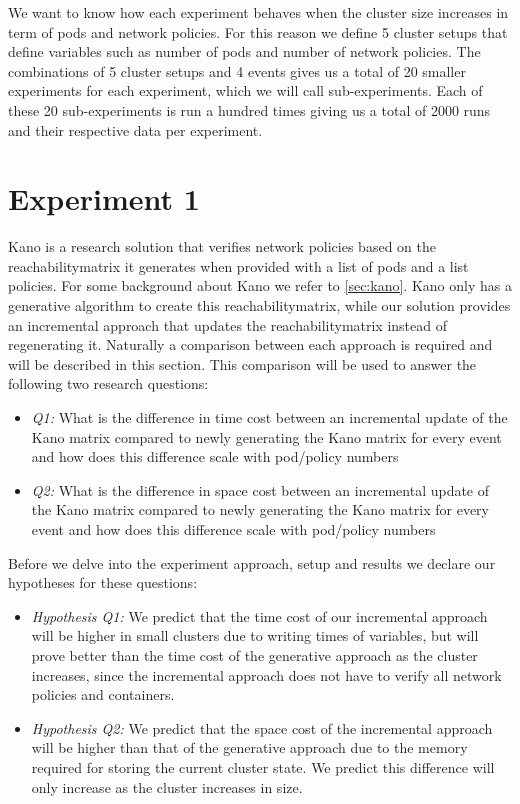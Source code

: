 We want to know how each experiment behaves when the cluster size increases in term of pods and network policies. For this reason we define 5 cluster setups that define variables such as number of pods and number of network policies. The combinations of 5 cluster setups and 4 events gives us a total of 20 smaller experiments for each experiment,  which we will call sub-experiments.  Each of these 20 sub-experiments is run a hundred times giving us a total of 2000 runs and their respective data per experiment.
\\[10pt]


\section{Experiment 1}\label{sec:experiment1}
Kano is a research solution that verifies network policies  based on the reachabilitymatrix it generates when provided with a list of pods and a list policies. For some background about Kano we refer to \autoref{sec:kano}. Kano only has a generative algorithm to create this reachabilitymatrix, while our solution provides an incremental approach that updates the reachabilitymatrix instead of regenerating it. Naturally a comparison between each approach is required and will be described in this section. This comparison will be used to answer the following two research questions:

\begin{itemize}
    \item \textit{Q1:} What is the difference in time cost between an incremental update of the Kano matrix compared to newly generating the Kano matrix for every event and how does this difference scale with pod/policy numbers
    \item \textit{Q2:} What is the difference in space cost between an incremental update of the Kano matrix compared to newly generating the Kano matrix for every event and how does this difference scale with pod/policy numbers
\end{itemize}

Before we delve into the experiment approach, setup and results we declare our hypotheses for these questions:

\begin{itemize}
    \item \textit{Hypothesis Q1:} We predict that the time cost of our incremental approach will be higher in small clusters due to writing times of variables, but will prove better than the time cost of the generative approach as the cluster increases, since the incremental approach does not have to verify all network policies and containers.
    \item \textit{Hypothesis Q2:} We predict that the space cost of the incremental approach will be higher than that of the generative approach due to the memory required for storing the current cluster state. We predict this difference will only increase as the cluster increases in size.
\end{itemize}

